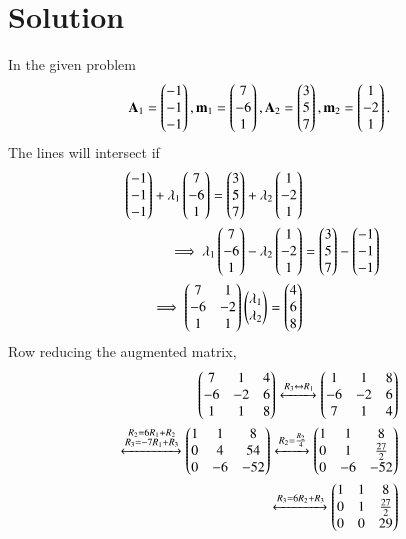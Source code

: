 \documentclass[journal,12pt,twocolumn]{IEEEtran}
\begin{document}
\section{Solution}
In the given  problem
\begin{align}
\mathbf{A}_1= \begin{pmatrix}-1\\-1\\-1\end{pmatrix}, \mathbf{m}_1=\begin{pmatrix}7 \\ -6 \\1\end{pmatrix},
\mathbf{A}_2= \begin{pmatrix}3\\5\\7\end{pmatrix}, \mathbf{m}_2 =\begin{pmatrix}1 \\ -2 \\1\end{pmatrix}.
\end{align}
The lines will intersect if
\begin{align}
\begin{pmatrix}-1\\-1\\-1\end{pmatrix} + \lambda_1\begin{pmatrix}7 \\ -6 \\1\end{pmatrix}
= \begin{pmatrix}3\\5\\7\end{pmatrix} + \lambda_2\begin{pmatrix}1 \\ -2 \\1\end{pmatrix}
\\
\implies \lambda_1\begin{pmatrix}7 \\ -6 \\1\end{pmatrix} - \lambda_2\begin{pmatrix}1 \\ -2 \\1\end{pmatrix} &= \begin{pmatrix}3\\5\\7\end{pmatrix}-\begin{pmatrix}-1\\-1\\-1\end{pmatrix}  
\\
\implies \begin{pmatrix}7 & 1 \\ -6 & -2 \\ 1 & 1\end{pmatrix}\begin{pmatrix}\lambda_1\\ \lambda_2\end{pmatrix} = \begin{pmatrix}4\\6\\8\end{pmatrix}\label{condition}
\end{align}
Row reducing the augmented matrix,
\begin{align}
\begin{pmatrix}
7 & 1 & 4 
\\
-6 & -2 & 6
\\
1 & 1 & 8
\end{pmatrix}
\xleftrightarrow[]{R_3\leftrightarrow R_1}
\begin{pmatrix}
1 & 1 & 8
\\
-6 & -2 & 6
\\
7 & 1 & 4
\end{pmatrix}
\\
\xleftrightarrow[]{\substack{R_2= 6R_1+R_2\\R_3 = -7R_1+R_3}}
\begin{pmatrix}
1 & 1 & 8
\\
0 & 4 & 54
\\
0 & -6 & -52
\end{pmatrix}
\xleftrightarrow[]{R_2= \frac{R_2}{4}}
\begin{pmatrix}
1 & 1 & 8
\\
0 & 1 & \frac{27}{2}
\\
0 & -6 & -52
\end{pmatrix}
\\
\xleftrightarrow[]{R_3=6R_2+R_3}
\begin{pmatrix}
1 & 1 & 8
\\
0 & 1 & \frac{27}{2}
\\
0 & 0 & 29
\end{pmatrix}
\end{align}
\end{document}
